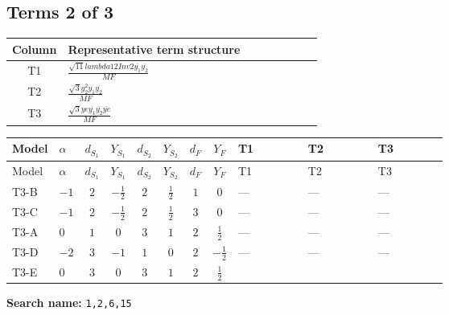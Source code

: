 \documentclass[8pt]{article}
\begin{document}
\begin{landscape}
\subsection*{Terms 2 of 3}
\begin{center}
\begin{tabular}{@{}c >{\raggedright\arraybackslash}p{0.82\linewidth}@{}}
\toprule
Column & Representative term structure \\
\midrule
T1 & \(\displaystyle \frac{\sqrt{11} lambda12Inv2 \overline{y_{1}} \overline{y_{2}}}{MF}\) \\
\midrule
T2 & \(\displaystyle \frac{\sqrt{3} g_{2}^{2} \overline{y_{1}} \overline{y_{2}}}{MF}\) \\
\midrule
T3 & \(\displaystyle \frac{\sqrt{3} ye \overline{y_{1}} \overline{y_{2}} \overline{ye}}{MF}\) \\
\midrule
\bottomrule
\end{tabular}
\end{center}
\smallskip
\tiny
\begin{longtable}{@{}llcccccc >{\raggedright\arraybackslash}p{0.21\linewidth} >{\raggedright\arraybackslash}p{0.21\linewidth} >{\raggedright\arraybackslash}p{0.21\linewidth}@{}}
\toprule
Model & $\alpha$ & $d_{S_1}$ & $Y_{S_1}$ & $d_{S_2}$ & $Y_{S_2}$ & $d_F$ & $Y_F$ & T1 & T2 & T3 \\
\midrule
\endfirsthead
\toprule
Model & $\alpha$ & $d_{S_1}$ & $Y_{S_1}$ & $d_{S_2}$ & $Y_{S_2}$ & $d_F$ & $Y_F$ & T1 & T2 & T3 \\
\midrule
\endhead
T3-B & $-1$ & $2$ & $-\frac{1}{2}$ & $2$ & $\frac{1}{2}$ & $1$ & $0$ & --- & --- & --- \\
\midrule
T3-C & $-1$ & $2$ & $-\frac{1}{2}$ & $2$ & $\frac{1}{2}$ & $3$ & $0$ & --- & --- & --- \\
\midrule
T3-A & $0$ & $1$ & $0$ & $3$ & $1$ & $2$ & $\frac{1}{2}$ & --- & --- & --- \\
\midrule
T3-D & $-2$ & $3$ & $-1$ & $1$ & $0$ & $2$ & $-\frac{1}{2}$ & --- & --- & --- \\
\midrule
T3-E & $0$ & $3$ & $0$ & $3$ & $1$ & $2$ & $\frac{1}{2}$ & \scriptsize\adjustbox{max width=\linewidth}{$\begin{gathered} \frac{3 \sqrt{11} lambda12Inv2 \overline{y_{1}} \overline{y_{2}}}{22 MF}\end{gathered}$} & \scriptsize\adjustbox{max width=\linewidth}{$\begin{gathered} \frac{15 \sqrt{3} g_{2}^{2} \overline{y_{1}} \overline{y_{2}}}{8 MF}\end{gathered}$} & \scriptsize\adjustbox{max width=\linewidth}{$\begin{gathered} - \frac{\sqrt{3} ye \overline{y_{1}} \overline{y_{2}} \overline{ye}}{12 MF}\end{gathered}$} \\
\midrule
\bottomrule
\end{longtable}
\clearpage
\noindent\textbf{Search name: }\texttt{1,2,6,15}\par\smallskip

\end{landscape}
\end{document}
